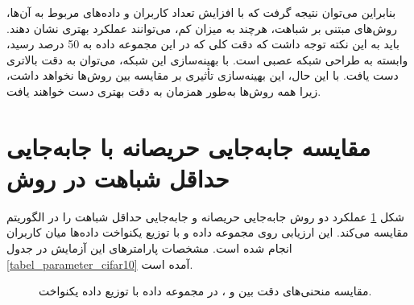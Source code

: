 بنابراین می‌توان نتیجه گرفت که با افزایش تعداد کاربران و داده‌های مربوط به آن‌ها، روش‌های مبتنی بر شباهت، هرچند به میزان کم، می‌توانند عملکرد بهتری نشان دهند.
باید به این نکته توجه داشت که دقت کلی که در این مجموعه داده به 50 درصد رسید، وابسته به طراحی شبکه عصبی است. با بهینه‌سازی این شبکه، می‌توان به دقت بالاتری دست یافت. با این حال، این بهینه‌سازی تأثیری بر مقایسه بین روش‌ها نخواهد داشت، زیرا همه روش‌ها به‌طور همزمان به دقت بهتری دست خواهند یافت.




\section{
	مقایسه جابه‌جایی حریصانه با جابه‌جایی حداقل شباهت در روش
}

شکل
\ref{result_MSS_vs_GS_cifar10}
عملکرد دو روش جابه‌جایی حریصانه و جابه‌جایی حداقل شباهت را در الگوریتم
مقایسه می‌کند. این ارزیابی روی مجموعه داده
و با توزیع یکنواخت داده‌ها میان کاربران انجام شده است. مشخصات پارامترهای این آزمایش در جدول
\ref{tabel_parameter_cifar10}
آمده است.


\begin{figure}[t!]
	\centering
	\hspace{0.8mm}
	\caption{
		مقایسه منحنی‌های دقت بین
		و
		، در مجموعه داده
		با توزیع داده یکنواخت.
	}
	\label{result_MSS_vs_GS_cifar10}
\end{figure}


